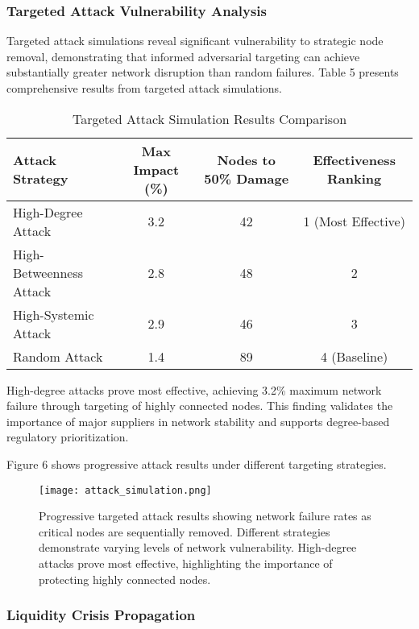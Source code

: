 \documentclass[a4 paper, 11pt,twoside]{article}
\newcommand{\0}{\Bf{0}}
\theoremstyle{definition}
\begin{document}
\subsubsection{Targeted Attack Vulnerability Analysis}

Targeted attack simulations reveal significant vulnerability to strategic node removal, demonstrating that informed adversarial targeting can achieve substantially greater network disruption than random failures. Table 5 presents comprehensive results from targeted attack simulations.

\begin{table}[H]
\centering
\caption{Targeted Attack Simulation Results Comparison}
\begin{tabular}{@{}lccc@{}}
\toprule
\textbf{Attack Strategy} & \textbf{Max Impact (\%)} & \textbf{Nodes to 50\% Damage} & \textbf{Effectiveness Ranking} \\
\midrule
High-Degree Attack & 3.2 & 42 & 1 (Most Effective) \\
High-Betweenness Attack & 2.8 & 48 & 2 \\
High-Systemic Attack & 2.9 & 46 & 3 \\
Random Attack & 1.4 & 89 & 4 (Baseline) \\
\bottomrule
\end{tabular}
\end{table}

High-degree attacks prove most effective, achieving 3.2\% maximum network failure through targeting of highly connected nodes. This finding validates the importance of major suppliers in network stability and supports degree-based regulatory prioritization.

Figure 6 shows progressive attack results under different targeting strategies.

\begin{figure}[H]
\centering
\texttt{[image: attack\_simulation.png]}
\caption{Progressive targeted attack results showing network failure rates as critical nodes are sequentially removed. Different strategies demonstrate varying levels of network vulnerability. High-degree attacks prove most effective, highlighting the importance of protecting highly connected nodes.}
\end{figure}

\subsubsection{Liquidity Crisis Propagation}
\end{document}
